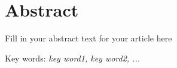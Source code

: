 
    \section*{Abstract}
    Fill in your abstract text for your article here
    
    \begin{flushleft}
Key words: \emph{ key word1, key word2, ...}
 
\end{flushleft}

